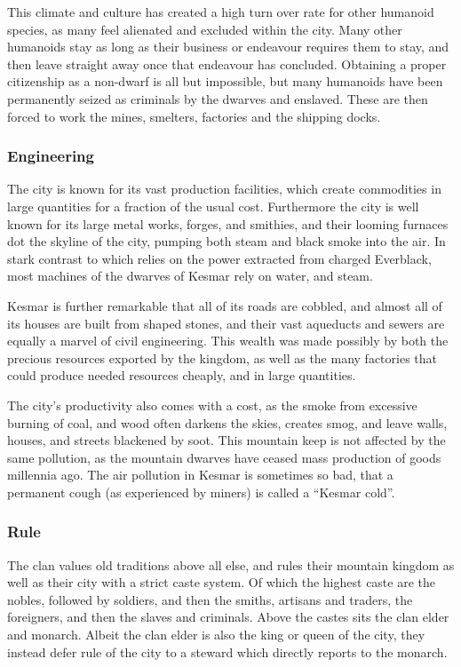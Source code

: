 This climate and culture has created a high turn over rate for other humanoid
species, as many feel alienated and excluded within the city. Many other
humanoids stay as long as their business or endeavour requires them to stay,
and then leave straight away once that endeavour has concluded. Obtaining a
proper citizenship as a non-dwarf is all but impossible, but many humanoids
have been permanently seized as criminals by the dwarves and enslaved. These
are then forced to work the mines, smelters, factories and the shipping docks.

\subsubsection{Engineering}

The city is known for its vast production facilities, which create commodities
in large quantities for a fraction of the usual cost. Furthermore the city is
well known for its large metal works, forges, and smithies, and their looming
furnaces dot the skyline of the city, pumping both steam and black smoke into
the air. In stark contrast to  which relies on the power
extracted from charged Everblack, most machines of the dwarves of Kesmar rely
on water, and steam.

Kesmar is further remarkable that all of its roads are cobbled, and almost
all of its houses are built from shaped stones, and their vast aqueducts and
sewers are equally a marvel of civil engineering. This wealth was made possibly
by both the precious resources exported by the kingdom, as well as the many
factories that could produce needed resources cheaply, and in large quantities.

The city's productivity also comes with a cost, as the smoke from excessive
burning of coal, and wood often darkens the skies, creates smog, and leave
walls, houses, and streets blackened by soot. This mountain keep is not affected
by the same pollution, as the mountain dwarves have ceased mass production of
goods millennia ago. The air pollution in Kesmar is sometimes so bad, that a
permanent cough (as experienced by miners) is called a ``Kesmar cold''.

\subsubsection{Rule}

The clan values old traditions above all else, and rules their mountain
kingdom as well as their city with a strict caste system. Of which the highest
caste are the nobles, followed by soldiers, and then the smiths, artisans and
traders, the foreigners, and then the slaves and criminals. Above the castes
sits the clan elder and monarch. Albeit the clan elder is also the king or queen
of the city, they instead defer rule of the city to a steward which directly
reports to the monarch.

